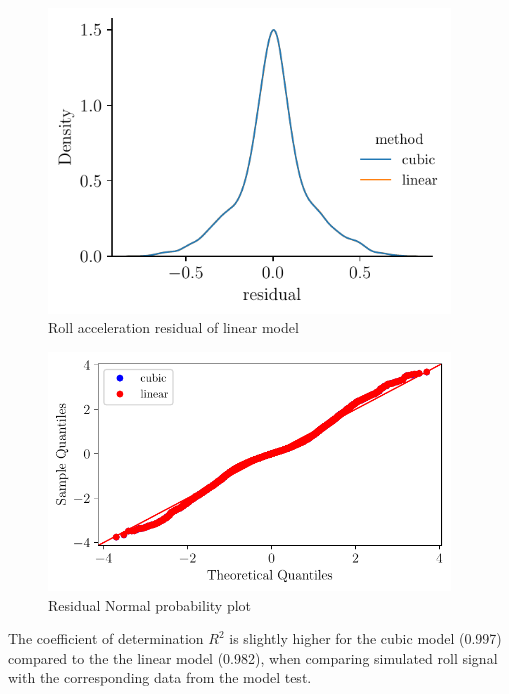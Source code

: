 \begin{figure}[H]
\begin{center}\includegraphics[width = 0.95\textwidth]{figures/roll_acceleration_residual.pdf}\end{center}
\vspace{-0.7cm}
\caption{Roll acceleration residual of linear model}
\label{fig:roll_acceleration_residual}
\end{figure}
\begin{figure}[H]
\begin{center}\includegraphics[width = 0.95\textwidth]{figures/residual_normal_probability_plot.pdf}\end{center}
\vspace{-0.7cm}
\caption{Residual Normal probability plot}
\label{fig:residual_normal_probability_plot}
\end{figure}
The coefficient of determination $R^2$ is slightly higher for the
cubic model (0.997) compared to the the linear model (0.982), when
comparing simulated roll signal with the corresponding data from the
model test.
